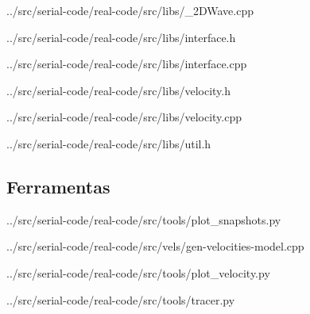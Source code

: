 \begin{appendices}
	
	{../src/serial-code/real-code/src/libs/_2DWave.cpp}
	
	
	{../src/serial-code/real-code/src/libs/interface.h}
	
	
	{../src/serial-code/real-code/src/libs/interface.cpp}
	
	
	{../src/serial-code/real-code/src/libs/velocity.h}
	
	
	{../src/serial-code/real-code/src/libs/velocity.cpp}

	
	{../src/serial-code/real-code/src/libs/util.h}
	
	\subsection{Ferramentas}
	
	{../src/serial-code/real-code/src/tools/plot_snapshots.py}

	
	{../src/serial-code/real-code/src/vels/gen-velocities-model.cpp}

	
	{../src/serial-code/real-code/src/tools/plot_velocity.py}

	
	{../src/serial-code/real-code/src/tools/tracer.py}
	

\end{appendices}
